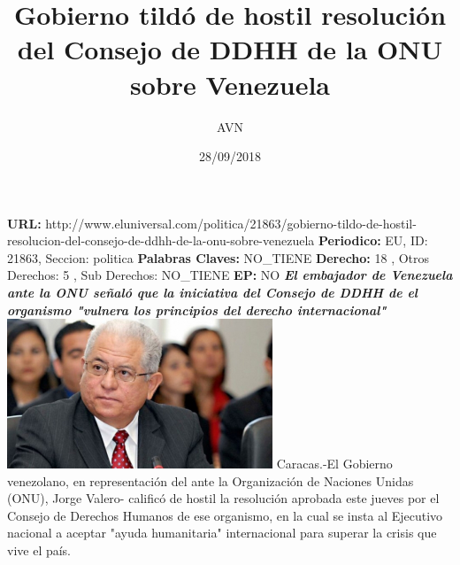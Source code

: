 \documentclass{article}%
\title{\textbf{Gobierno tildó de hostil resolución del Consejo de DDHH de la ONU sobre Venezuela}}%
\author{AVN}%
\date{28/09/2018}%
\begin{document}
%
\normalsize%
\maketitle%
\textbf{URL: }%
http://www.eluniversal.com/politica/21863/gobierno{-}tildo{-}de{-}hostil{-}resolucion{-}del{-}consejo{-}de{-}ddhh{-}de{-}la{-}onu{-}sobre{-}venezuela\newline%
%
\textbf{Periodico: }%
EU, %
ID: %
21863, %
Seccion: %
politica\newline%
%
\textbf{Palabras Claves: }%
NO\_TIENE\newline%
%
\textbf{Derecho: }%
18%
, Otros Derechos: %
5%
, Sub Derechos: %
NO\_TIENE%
\newline%
%
\textbf{EP: }%
NO\newline%
\newline%
%
\textbf{\textit{El embajador de Venezuela ante la ONU señaló que la iniciativa del Consejo de DDHH de el organismo "vulnera los principios del derecho internacional"}}%
\newline%
\newline%
%
\includegraphics[width=300px]{137.jpg}%
\newline%
%
Caracas.{-}El Gobierno venezolano, en representación del ante la Organización de Naciones Unidas (ONU), Jorge Valero{-} calificó de hostil la resolución aprobada este jueves por el Consejo de Derechos Humanos de ese organismo, en la cual se insta al Ejecutivo nacional a aceptar "ayuda humanitaria" internacional para superar la crisis que vive el país.%
\newline%
%
\end{document}
